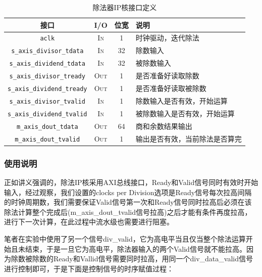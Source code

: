\documentclass[UTF-8,twoside,c5size]{ctexart}
\begin{document}
	\begin{table}[!h]
	\begin{center}
		\caption{除法器IP核接口定义}
		\begin{tabularx}{\textwidth}{|c|c|c|Y|}
			\hline
			\textbf{接口} & \textbf{I/O} & \textbf{位宽} & \textbf{说明} \\
			\hline
			\texttt{aclk} & \textsc{In} & 1 & 时钟驱动，迭代除法 \\
			\hline
			\texttt{s\_axis\_divisor\_tdata} & \textsc{In} & 32 & 除数输入 \\
			\hline
			\texttt{s\_axis\_dividend\_tdata} & \textsc{In} & 32 & 被除数输入 \\
			\hline
			\texttt{s\_axis\_divisor\_tready} & \textsc{Out} & 1 & 是否准备好读取除数 \\
			\hline
			\texttt{s\_axis\_dividend\_tready} & \textsc{Out} & 1 & 是否准备好读取被除数 \\
			\hline
			\texttt{s\_axis\_divisor\_tvalid} & \textsc{In} & 1 & 除数输入是否有效，开始运算 \\
			\hline
			\texttt{s\_axis\_dividend\_tvalid} & \textsc{In} & 1 & 被除数输入是否有效，开始运算 \\
			\hline
			\texttt{m\_axis\_dout\_tdata} & \textsc{Out} & 64 & 商和余数结果输出 \\
			\hline
			\texttt{m\_axis\_dout\_tvalid} & \textsc{Out} & 1 & 输出是否有效，当前除法是否算完 \\
			\hline
		\end{tabularx}
	\end{center}
	\end{table}

	\subsubsection{使用说明}
	\label{Valid_input}

	正如讲义强调的，除法IP核采用AXI总线接口，Ready和Valid信号同时有效时开始输入，经过观察，我们设置的clocks per Division选项是Ready信号每次拉高间隔的时钟周期数，我们需要保证Valid信号第一次和Ready信号同时拉高后必须在该除法计算整个完成后(m\_axis\_dout\_tvalid信号拉高)之后才能有条件再度拉高，进行下一次计算，在此过程中流水级也需要进行阻塞。
	
	笔者在实验中使用了另一个信号div\_valid，它为高电平当且仅当整个除法运算开始且未结束，于是一旦它为高电平，除法器输入的两个Valid信号就不能拉高。因为除数被除数的Ready和Vallid信号需要同时拉高，用同一个div\_data\_valid信号进行控制即可，于是下面是控制信号的时序赋值过程：
	
\end{document}
